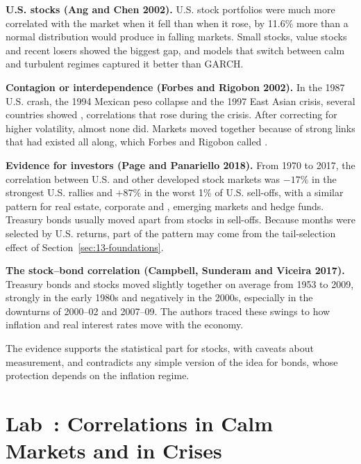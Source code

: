 \textbf{U.S. stocks (Ang and Chen 2002).} U.S. stock portfolios were much more correlated with the market when it fell than when it rose, by 11.6\% more than a normal distribution would produce in falling markets. Small stocks, value stocks and recent losers showed the biggest gap, and models that switch between calm and turbulent regimes captured it better than GARCH.

\textbf{Contagion or interdependence (Forbes and Rigobon 2002).} In the 1987 U.S. crash, the 1994 Mexican peso collapse and the 1997 East Asian crisis, several countries showed , correlations that rose during the crisis. After correcting for higher volatility, almost none did. Markets moved together because of strong links that had existed all along, which Forbes and Rigobon called .

\textbf{Evidence for investors (Page and Panariello 2018).} From 1970 to 2017, the correlation between U.S. and other developed stock markets was $-17\%$ in the strongest U.S. rallies and $+87\%$ in the worst 1\% of U.S. sell-offs, with a similar pattern for real estate, corporate and , emerging markets and hedge funds. Treasury bonds usually moved apart from stocks in sell-offs. Because months were selected by U.S. returns, part of the pattern may come from the tail-selection effect of Section~\ref{sec:13-foundations}.

\textbf{The stock--bond correlation (Campbell, Sunderam and Viceira 2017).} Treasury bonds and stocks moved slightly together on average from 1953 to 2009, strongly in the early 1980s and negatively in the 2000s, especially in the downturns of 2000--02 and 2007--09. The authors traced these swings to how inflation and real interest rates move with the economy.

The evidence supports the statistical part for stocks, with caveats about measurement, and contradicts any simple version of the idea for bonds, whose protection depends on the inflation regime.

\section{Lab~\thechapter: Correlations in Calm Markets and in Crises}
\label{sec:13-lab}

